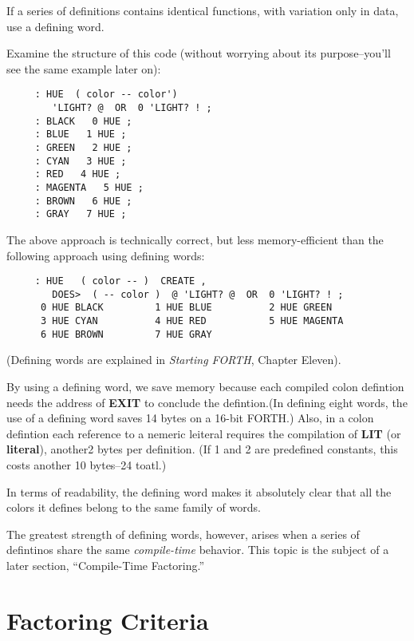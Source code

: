 \begin{tip}
If a series of definitions contains identical functions, with variation only in data, use a defining word.
\end{tip}
Examine the structure of this code (without worrying about its purpose--you'll see the same example later on):

\begin{verbatim}
     : HUE  ( color -- color') 
        'LIGHT? @  OR  0 'LIGHT? ! ;
     : BLACK   0 HUE ;
     : BLUE   1 HUE ;
     : GREEN   2 HUE ;
     : CYAN   3 HUE ;
     : RED   4 HUE ;
     : MAGENTA   5 HUE ;
     : BROWN   6 HUE ;
     : GRAY   7 HUE ;
\end{verbatim}

\noindent The above approach is technically correct, but less memory-efficient than the following approach using defining words:

\begin{verbatim}
     : HUE   ( color -- )  CREATE ,
        DOES>  ( -- color )  @ 'LIGHT? @  OR  0 'LIGHT? ! ;
      0 HUE BLACK         1 HUE BLUE          2 HUE GREEN
      3 HUE CYAN          4 HUE RED           5 HUE MAGENTA
      6 HUE BROWN         7 HUE GRAY
\end{verbatim}

\noindent 
(Defining words are explained in \textit{Starting FORTH}, Chapter Eleven).

By using a defining word, we save memory because each compiled colon defintion needs the address of \textbf{EXIT} to conclude the defintion.(In defining eight words, the use of a defining word saves 14 bytes on a 16-bit FORTH.) Also, in a colon defintion each reference to a nemeric leiteral requires the compilation of \textbf{LIT} (or \textbf{literal}), another2 bytes per definition. (If 1 and 2 are predefined constants, this costs another 10 bytes--24 toatl.)

In terms of readability, the defining word makes it absolutely clear that all the colors it defines belong to the same family of words.

The greatest strength of defining words, however, arises when a series of defintinos share the same \textit{compile-time} behavior. This topic is the subject of a later section, ``Compile-Time Factoring.''

\section{Factoring Criteria}

